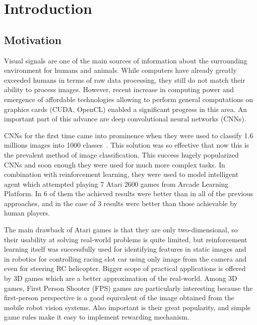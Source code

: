
\chapter{Introduction}
\label{ch:introduction}
\section{Motivation}
\label{sec:motivation}

Visual signals are one of the main sources of information about the surrounding environment for humans and animals.
While computers have already greatly exceeded humans in terms of raw data processing, they still do not match their ability to process images.
However, recent increase in computing power and emergence of affordable technologies allowing to perform general computations on graphics cards (CUDA, OpenCL) enabled a significant progress in this area.
An important part of this advance are deep convolutional neural networks (CNNs).


CNNs for the first time came into prominence when they were used to classify 1.6 millions images into 1000 classes~\cite{NIPS2012_4824}.
This solution was so effective that now this is the prevalent method of image classification.
This success hugely popularized CNNs and soon enough they were used for much more complex tasks.
In combination with reinforcement learning, they were used to model intelligent agent which attempted playing 7 Atari 2600 games from Arcade Learning Platform\cite{mnih-atari-2013}.
In 6 of them the achieved results were better than in all of the previous approaches, and in the case of 3 results were better than those achievable by human players.

The main drawback of Atari games is that they are only two-dimensional, so their usability at solving real-world problems is quite limited, but reinforcement learning itself was successfully used for identifying features in static images \cite{conf/cvpr/GoodrichA12} and in robotics for controlling racing slot car using only image from the camera \cite{rieijcnn12} and even for steering RC helicopter\cite{Abbeel07anapplication}.
Bigger scope of practical applications is offered by 3D games which are a better approximation of the real-world.
Among 3D games, First Person Shooter (FPS) games are particularly interesting because the first-person perspective is a good equivalent of the image obtained from the mobile robot vision systems.
Also important is their great popularity, and simple game rules make it easy to implement rewarding mechanism.

